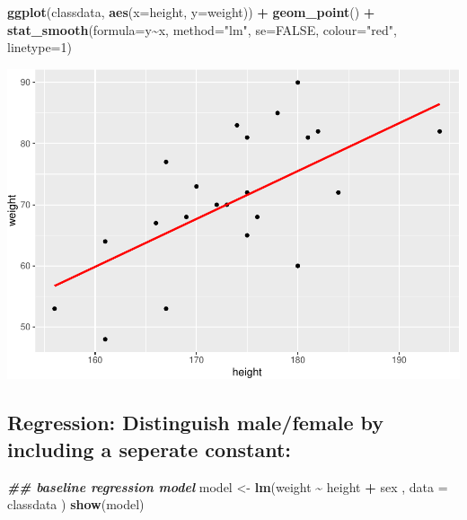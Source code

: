 \documentclass[
  doc]{apa6}
\newenvironment{Shaded}{\begin{snugshade}}{\end{snugshade}}
\newcommand{\AttributeTok}[1]{\textcolor[rgb]{0.13,0.29,0.53}{#1}}
\newcommand{\ConstantTok}[1]{\textcolor[rgb]{0.56,0.35,0.01}{#1}}
\newcommand{\DecValTok}[1]{\textcolor[rgb]{0.00,0.00,0.81}{#1}}
\newcommand{\DocumentationTok}[1]{\textcolor[rgb]{0.56,0.35,0.01}{\textbf{\textit{#1}}}}
\newcommand{\FunctionTok}[1]{\textcolor[rgb]{0.13,0.29,0.53}{\textbf{#1}}}
\newcommand{\NormalTok}[1]{#1}
\newcommand{\OtherTok}[1]{\textcolor[rgb]{0.56,0.35,0.01}{#1}}
\newcommand{\SpecialCharTok}[1]{\textcolor[rgb]{0.81,0.36,0.00}{\textbf{#1}}}
\newcommand{\StringTok}[1]{\textcolor[rgb]{0.31,0.60,0.02}{#1}}
\begin{document}
\begin{Shaded}
\begin{Highlighting}[]
\FunctionTok{ggplot}\NormalTok{(classdata, }\FunctionTok{aes}\NormalTok{(}\AttributeTok{x=}\NormalTok{height, }\AttributeTok{y=}\NormalTok{weight)) }\SpecialCharTok{+}
  \FunctionTok{geom\_point}\NormalTok{() }\SpecialCharTok{+}
  \FunctionTok{stat\_smooth}\NormalTok{(}\AttributeTok{formula=}\NormalTok{y}\SpecialCharTok{\textasciitilde{}}\NormalTok{x, }\AttributeTok{method=}\StringTok{"lm"}\NormalTok{, }\AttributeTok{se=}\ConstantTok{FALSE}\NormalTok{, }\AttributeTok{colour=}\StringTok{"red"}\NormalTok{, }\AttributeTok{linetype=}\DecValTok{1}\NormalTok{)}
\end{Highlighting}
\end{Shaded}

\includegraphics{rmd_reg_files/figure-latex/unnamed-chunk-9-1.pdf}

\newpage

\hypertarget{regression-distinguish-malefemale-by-including-a-seperate-constant}{%
\subsection{Regression: Distinguish male/female by including a seperate constant:}\label{regression-distinguish-malefemale-by-including-a-seperate-constant}}

\begin{Shaded}
\begin{Highlighting}[]
\DocumentationTok{\#\# baseline regression  model}
\NormalTok{model  }\OtherTok{\textless{}{-}} \FunctionTok{lm}\NormalTok{(weight }\SpecialCharTok{\textasciitilde{}}\NormalTok{ height }\SpecialCharTok{+}\NormalTok{ sex , }\AttributeTok{data =}\NormalTok{ classdata )}
\FunctionTok{show}\NormalTok{(model)}
\end{Highlighting}
\end{Shaded}
\end{document}
